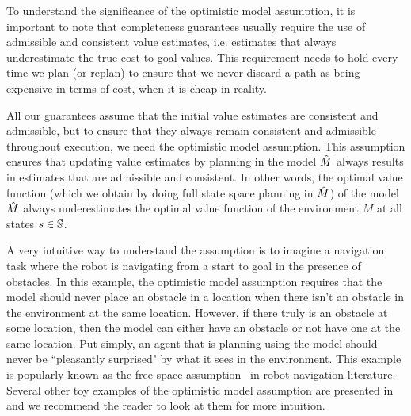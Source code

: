 To understand the significance of the optimistic model assumption, it
is important to note that completeness guarantees usually require the
use of admissible and consistent value estimates, i.e. estimates that
always underestimate the true cost-to-goal values. This requirement
needs to hold every time we plan (or replan) to ensure that we never
discard a path as being expensive in terms of cost, when it is cheap
in reality.


All our guarantees assume that the initial value estimates are
consistent and admissible, but to ensure that they always remain
consistent and admissible throughout execution, we need the optimistic
model assumption. This assumption ensures that updating value
estimates by planning in the model $\hat{M}$ always results in estimates
that are admissible and consistent. In other words, the optimal value
function (which we obtain by doing full state space planning in
$\hat{M}$) of the model $\hat{M}$ always underestimates the optimal value
function of the environment $M$ at all states $s \in \mathbb{S}$.


A very intuitive way to understand the assumption is to imagine a
navigation task where the robot is navigating from a start to goal in
the presence of obstacles. In this example, the optimistic model
assumption requires that the model should never place an obstacle in a
location when there isn't an obstacle in the environment at the same
location. However, if there truly is an obstacle at some location,
then the model can either have an obstacle or not have one at the same
location. Put simply, an agent that is planning using the model should
never be ``pleasantly surprised" by what it sees in the
environment. This example is popularly known as the free space
assumption~\cite{DBLP:journals/trob/Zelinsky92} in robot navigation literature.
Several other toy examples of the optimistic model assumption are presented
in~\cite{DBLP:conf/aaai/Jiang18} and we recommend the reader to look
at them for more intuition.


